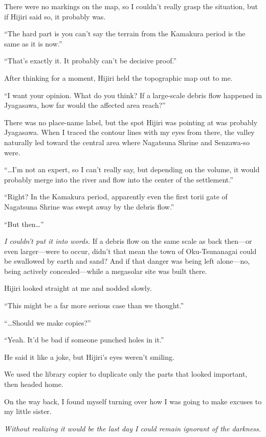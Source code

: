 \documentclass[
    a4paper,
    12pt,
    twoside,
    openany,
    UTF8,
    fontset=windows
]{ctexbook}
\begin{document}
There were no markings on the map, so I couldn't really grasp the situation, but if Hijiri said so, it probably was.

``The hard part is you can't say the terrain from the Kamakura period is the same as it is now.''

``That's exactly it. It probably can't be decisive proof.''

After thinking for a moment, Hijiri held the topographic map out to me.

``I want your opinion. What do you think? If a large-scale debris flow happened in Jyagasawa, how far would the affected area reach?''

There was no place-name label, but the spot Hijiri was pointing at was probably Jyagasawa. When I traced the contour lines with my eyes from there, the valley naturally led toward the central area where Nagatsuna Shrine and Senzawa-so were.

``\dots I'm not an expert, so I can't really say, but depending on the volume, it would probably merge into the river and flow into the center of the settlement.''

``Right? In the Kamakura period, apparently even the first torii gate of Nagatsuna Shrine was swept away by the debris flow.''

``But then\dots''

\textit{I couldn't put it into words.} If a debris flow on the same scale as back then---or even larger---were to occur, didn't that mean the town of Oku-Tsunanagai could be swallowed by earth and sand? And if that danger was being left alone---no, being actively concealed---while a megasolar site was built there.

Hijiri looked straight at me and nodded slowly.

``This might be a far more serious case than we thought.''

``\dots Should we make copies?''

``Yeah. It'd be bad if someone punched holes in it.''

He said it like a joke, but Hijiri's eyes weren't smiling.

We used the library copier to duplicate only the parts that looked important, then headed home.

On the way back, I found myself turning over how I was going to make excuses to my little sister.

\textit{Without realizing it would be the last day I could remain ignorant of the darkness.}
\end{document}
